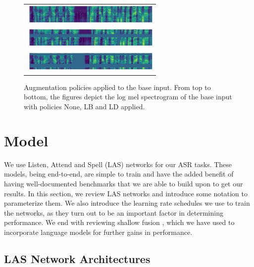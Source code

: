 \documentclass[a4paper]{article}
\begin{document}
\begin{figure}[t]
  \centering
  \begin{tabular}{c}
  \includegraphics[height=1.0cm]{figures/n0.png} \\
  \includegraphics[height=1.0cm]{figures/n1.png} \\
  \includegraphics[height=1.0cm]{figures/n2.png}
  \end{tabular}
  \vskip -0.05in
  \caption{Augmentation policies applied to the base input. From top to bottom, the figures depict the log mel spectrogram of the base input with policies None, LB and LD applied.}
  \label{fig:policies}
  \vskip -0.15in
\end{figure}

\section{Model}

We use Listen, Attend and Spell (LAS) networks \cite{Chan2016ListenAA} for our ASR tasks. These models, being end-to-end, are simple to train and have the added benefit of having well-documented benchmarks \cite{zeyer-interspeech-2018, irie-arxiv-2019} that we are able to build upon to get our results. In this section, we review LAS networks and introduce some notation to parameterize them. We also introduce the learning rate schedules we use to train the networks, as they turn out to be an important factor in determining performance. We end with reviewing shallow fusion \cite{gulcehre-2015-arxiv}, which we have used to incorporate language models for further gains in performance.

\subsection{LAS Network Architectures}
\end{document}
